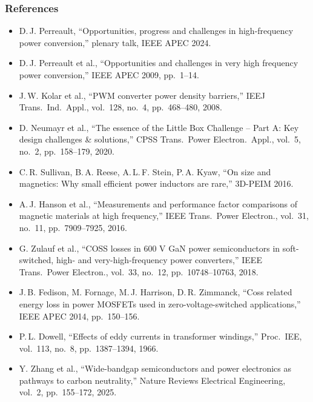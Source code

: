 \begin{frame}
	\frametitle{References}
	\scriptsize
	\begin{itemize}
		\item D.\,J. Perreault, ``Opportunities, progress and challenges in high-frequency power conversion,'' plenary talk, IEEE APEC 2024.
		\item D.\,J. Perreault et al., ``Opportunities and challenges in very high frequency power conversion,'' IEEE APEC 2009, pp.\ 1--14.
		\item J.\,W. Kolar et al., ``PWM converter power density barriers,'' IEEJ Trans.\ Ind.\ Appl., vol.\ 128, no.\ 4, pp.\ 468--480, 2008.
		\item D. Neumayr et al., ``The essence of the Little Box Challenge -- Part A: Key design challenges \& solutions,'' CPSS Trans.\ Power Electron.\ Appl., vol.\ 5, no.\ 2, pp.\ 158--179, 2020.
		\item C.\,R. Sullivan, B.\,A. Reese, A.\,L.\,F. Stein, P.\,A. Kyaw, ``On size and magnetics: Why small efficient power inductors are rare,'' 3D-PEIM 2016.
		\item A.\,J. Hanson et al., ``Measurements and performance factor comparisons of magnetic materials at high frequency,'' IEEE Trans.\ Power Electron., vol.\ 31, no.\ 11, pp.\ 7909--7925, 2016.
		\item G. Zulauf et al., ``COSS losses in 600 V GaN power semiconductors in soft-switched, high- and very-high-frequency power converters,'' IEEE Trans.\ Power Electron., vol.\ 33, no.\ 12, pp.\ 10748--10763, 2018.
		\item J.\,B. Fedison, M. Fornage, M.\,J. Harrison, D.\,R. Zimmanck, ``Coss related energy loss in power MOSFETs used in zero-voltage-switched applications,'' IEEE APEC 2014, pp.\ 150--156.
		\item P.\,L. Dowell, ``Effects of eddy currents in transformer windings,'' Proc.\ IEE, vol.\ 113, no.\ 8, pp.\ 1387--1394, 1966.
		\item Y. Zhang et al., ``Wide-bandgap semiconductors and power electronics as pathways to carbon neutrality,'' Nature Reviews Electrical Engineering, vol.\ 2, pp.\ 155--172, 2025.
	\end{itemize}
\end{frame}

